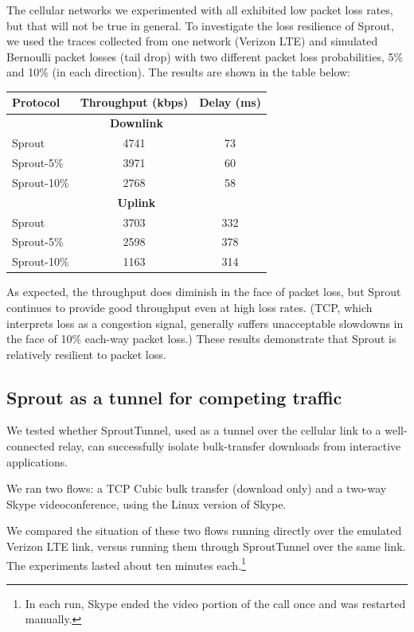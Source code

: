The cellular networks we experimented with all exhibited low packet
loss rates, but that will not be true in general. To investigate the
loss resilience of Sprout, we used the traces collected from one
network (Verizon LTE) and simulated Bernoulli packet losses
(tail drop) with two different packet loss probabilities, 5\% and 10\%
(in each direction). The results are shown in the table below:
\begin{center}
\small
\begin{tabular}{|l|c|c|}
\hline
 Protocol & Throughput (kbps) & Delay (ms) \\
\hline
\hline
\multicolumn{3}{|c|}{\bf Downlink} \\
\hline
Sprout & 4741 & 73 \\
Sprout-5\% & 3971 & 60 \\
Sprout-10\% & 2768 & 58\\
\hline
\multicolumn{3}{|c|}{\bf Uplink} \\
\hline
Sprout & 3703 & 332 \\
Sprout-5\% & 2598 & 378 \\
Sprout-10\% & 1163 & 314\\
\hline
\end{tabular}
\end{center}

As expected, the throughput does diminish in the face of packet loss,
but Sprout continues to provide good throughput even at high loss
rates. (TCP, which interprets loss as a congestion signal, generally
suffers unacceptable slowdowns in the face of 10\% each-way packet
loss.) These results demonstrate that Sprout is relatively resilient to
packet loss.

\subsection{Sprout as a tunnel for competing traffic}

We tested whether SproutTunnel, used as a tunnel over the
cellular link to a well-connected relay, can successfully isolate
bulk-transfer downloads from interactive applications.

We ran two flows: a TCP Cubic bulk transfer (download only) and a
two-way Skype videoconference, using the Linux version of Skype.

We compared the situation of these two flows running directly over the
emulated Verizon LTE link, versus running them through SproutTunnel
over the same link. The experiments lasted about ten minutes
each.\footnote{In each run, Skype ended the video portion of the call
  once and was restarted manually.}

